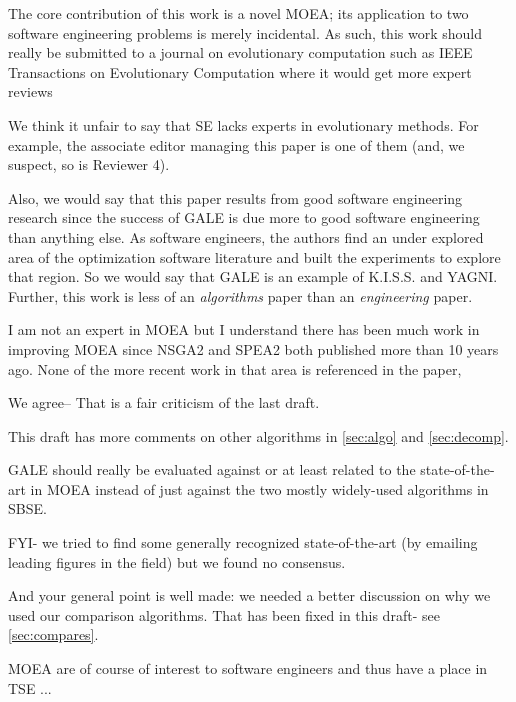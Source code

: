 \documentclass[10pt,journal,compsoc]{IEEEtran}
\newcommand{\tion}[1]{\textsection\ref{sec:#1}}
\newenvironment{changed}{\par\color{MyDarkBlue}}{\par}
\begin{document}
The core contribution of this work is a novel MOEA;
its application to two software engineering problems
is merely incidental. As such, this work should
really be submitted to a journal on evolutionary
computation such as IEEE Transactions on
Evolutionary Computation where it would get more
expert reviews
\begin{changed}
We think it unfair to say that SE lacks  experts in evolutionary
methods. For example, the associate editor managing
this paper is one of them (and, we suspect,
so is Reviewer 4).

Also, we would say that this paper results from good software
engineering research since
the success
of GALE is due more to good software engineering than
anything else.
As software engineers,
the authors find an under explored area of the optimization
software literature and built the experiments to explore
that region.  
So we would say that GALE is an example of K.I.S.S. and YAGNI.
Further,  this work is less of an {\em algorithms} paper
than an {\em engineering} paper. 


\end{changed}


I am not an expert in MOEA but I
understand there has been much work in improving
MOEA since NSGA2 and SPEA2 both published more than
10 years ago. None of the more recent work in that
area is referenced in the paper,

\begin{changed}
We agree-- That is a  fair criticism of the last draft. 

This draft has more comments on other algorithms in 
\tion{algo} and
\tion{decomp}.
\end{changed}

GALE should
really be evaluated against or at least related to
the state-of-the-art in MOEA instead of just against
the two mostly widely-used algorithms in SBSE.

\begin{changed}
FYI- we tried to find some generally recognized state-of-the-art
(by emailing leading figures in the field) but we found no consensus.

And your general point is well made: we needed a better
discussion on why we used our comparison algorithms.
That has been fixed in this draft- see  \tion{compares}.
\end{changed}

 MOEA are of course of interest to software engineers
and thus have a place in TSE ...
\end{document}
